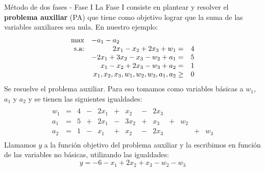 \documentclass[10pt, aspectratio=169]{beamer}
\begin{document}
    \begin{frame}{Método de dos fases - Fase I}
        \small
        La Fase I consiste en plantear y resolver el \textbf{problema auxiliar} (PA)
        que tiene como objetivo lograr que la suma de las variables auxiliares sea nula. En nuestro ejemplo:
        \[
            \begin{array}{rrl}
                \max & \multicolumn{2}{l}{-a_1-a_2} \\
                \text{s.a:} & 2x_1-x_2+2x_3 +w_1=                  & 4 \\
                & -2x_1+3x_2-x_3-w_2+a_1 =             & 5 \\
                & x_1-x_2+2x_3-w_3+a_2 =               & 1 \\
                & x_1,x_2,x_3,w_1,w_2,w_3,a_1,a_2 \geq & 0
            \end{array}
        \]
        Se resuelve el problema auxiliar. Para eso tomamos como variables básicas a $w_1$, $a_1$ y $a_2$
        y se tienen las siguientes igualdades:
        \[
            \begin{array}{rrrrrrrrrrrrr}
                & \\
                w_1 & = & 4 & - & 2x_1 & + & x_2  & - & 2x_3 &   &     &   &     \\
                a_1 & = & 5 & + & 2x_1 & - & 3x_2 & + & x_3  & + & w_2 &   &     \\
                a_2 & = & 1 & - & x_1  & + & x_2  & - & 2x_3 &   &     & + & w_3 \\
            \end{array}
        \]
        Llamamos $y$
        a la función objetivo del problema auxiliar y la escribimos en función de las variables no básicas, utilizando
        las igualdades:
        \[ y= -6-x_1+2x_2+x_3-w_2-w_3\]
    \end{frame}
\end{document}

